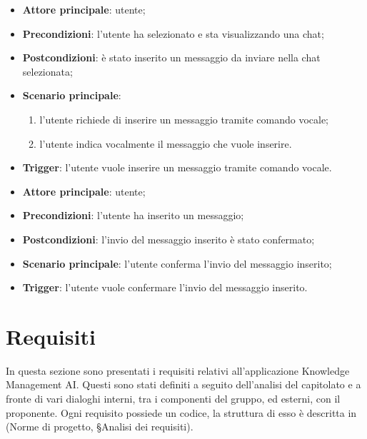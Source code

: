 \documentclass[10pt, a4paper]{article}
\begin{document}
    \begin{itemize}
        \item \textbf{Attore principale}: utente;
        \item \textbf{Precondizioni}: l’utente ha selezionato e sta visualizzando una chat;
        \item \textbf{Postcondizioni}: è stato inserito un messaggio da inviare nella chat selezionata;
        \item \textbf{Scenario principale}:
            \begin{enumerate}
                \item l’utente richiede di inserire un messaggio tramite comando vocale;
                \item l’utente indica vocalmente il messaggio che vuole inserire.
            \end{enumerate}
        \item \textbf{Trigger}: l’utente vuole inserire un messaggio tramite comando vocale.
    \end{itemize}

    \begin{itemize}
        \item \textbf{Attore principale}: utente;
        \item \textbf{Precondizioni}: l'utente ha inserito un messaggio;
        \item \textbf{Postcondizioni}: l'invio del messaggio inserito è stato confermato;
        \item \textbf{Scenario principale}: l’utente conferma l'invio del messaggio inserito;
        \item \textbf{Trigger}: l’utente vuole confermare l'invio del messaggio inserito.
    \end{itemize}

\newpage
\section{Requisiti}
In questa sezione sono presentati i requisiti relativi all’applicazione Knowledge Management AI. Questi sono stati definiti a seguito dell’analisi del capitolato e a fronte di vari dialoghi interni, tra i componenti del gruppo, ed esterni, con il proponente. Ogni requisito possiede un codice, la struttura di esso è descritta in (Norme di progetto, \S Analisi dei requisiti).
\end{document}
